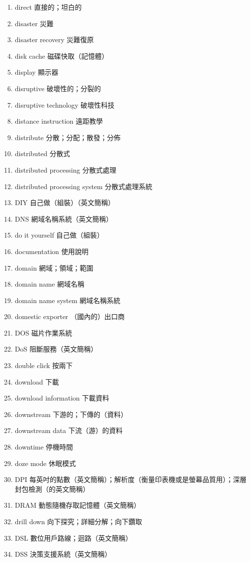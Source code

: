 \begin{enumerate}
  \item direct 直接的；坦白的
  \item disaster 災難
  \item disaster recovery 災難復原
  \item disk cache 磁碟快取（記憶體）
  \item display 顯示器
  \item disruptive 破壞性的；分裂的
  \item disruptive technology 破壞性科技
  \item distance instruction 遠距教學
  \item distribute 分散；分配；散發；分佈
  \item distributed 分散式
  \item distributed processing 分散式處理
  \item distributed processing system 分散式處理系統
  \item DIY 自己做（組裝）（英文簡稱）
  \item DNS 網域名稱系統（英文簡稱）
  \item do it yourself 自己做（組裝）
  \item documentation 使用說明
  \item domain 網域；領域；範圍
  \item domain name 網域名稱
  \item domain name system 網域名稱系統
  \item domestic exporter （國內的）出口商
  \item DOS 磁片作業系統
  \item DoS 阻斷服務（英文簡稱）
  \item double click 按兩下
  \item download 下載
  \item download information 下載資料
  \item downstream 下游的；下傳的（資料）
  \item downstream data 下流（游）的資料
  \item downtime 停機時間
  \item doze mode 休眠模式
  \item DPI 每英吋的點數（英文簡稱）；解析度（衡量印表機或是螢幕品質用）；深層封包檢測（的英文簡稱）
  \item DRAM 動態隨機存取記憶體（英文簡稱）
  \item drill down 向下探究；詳細分解；向下鑽取
  \item DSL 數位用戶路線；迴路（英文簡稱）
  \item DSS 決策支援系統（英文簡稱）

\end{enumerate}
